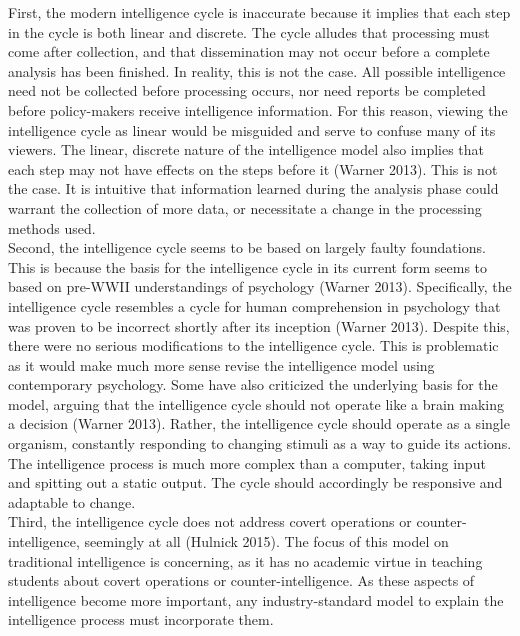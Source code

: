\documentclass[10pt, letterpaper]{article}
\begin{document}
First, the modern intelligence cycle is inaccurate because it implies that each step in the cycle is both linear and discrete. The cycle alludes that processing must come after collection, and that dissemination may not occur before a complete analysis has been finished. In reality, this is not the case. All possible intelligence need not be collected before processing occurs, nor need reports be completed before policy-makers receive intelligence information. For this reason, viewing the intelligence cycle as linear would be misguided and serve to confuse many of its viewers. The linear, discrete nature of the intelligence model also implies that each step may not have effects on the steps before it (Warner 2013). This is not the case. It is intuitive that information learned during the analysis phase could warrant the collection of more data, or necessitate a change in the processing methods used. \\

Second, the intelligence cycle seems to be based on largely faulty foundations. This is because the basis for the intelligence cycle in its current form seems to based on pre-WWII understandings of psychology (Warner 2013). Specifically, the intelligence cycle resembles a cycle for human comprehension in psychology that was proven to be incorrect shortly after its inception (Warner 2013). Despite this, there were no serious modifications to the intelligence cycle. This is problematic as it would make much more sense revise the intelligence model using contemporary psychology. Some have also criticized the underlying basis for the model, arguing that the intelligence cycle should not operate like a brain making a decision (Warner 2013). Rather, the intelligence cycle should operate as a single organism, constantly responding to changing stimuli as a way to guide its actions. The intelligence process is much more complex than a computer, taking input and spitting out a static output. The cycle should accordingly be responsive and adaptable to change. \\

Third, the intelligence cycle does not address covert operations or counter-intelligence, seemingly at all (Hulnick 2015). The focus of this model on traditional intelligence is concerning, as it has no academic virtue in teaching students about covert operations or counter-intelligence. As these aspects of intelligence become more important, any industry-standard model to explain the intelligence process must incorporate them. \\
\end{document}
